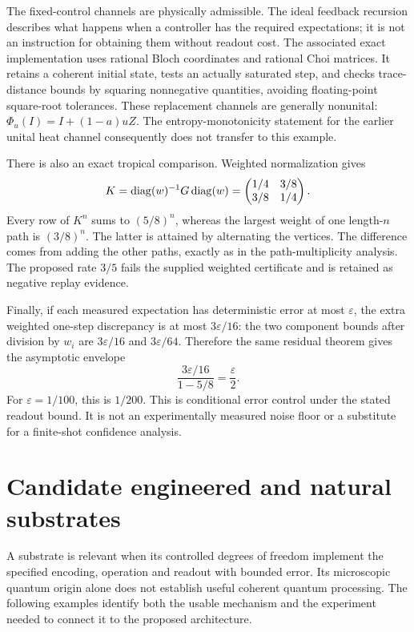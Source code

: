 The fixed-control channels are physically admissible. The ideal feedback
recursion describes what happens when a controller has the required
expectations; it is not an instruction for obtaining them without readout
cost. The associated exact implementation uses rational Bloch coordinates
and rational Choi matrices. It retains a coherent initial state, tests an
actually saturated step, and checks trace-distance bounds by squaring
nonnegative quantities, avoiding floating-point square-root tolerances.
These replacement channels are generally nonunital:
$\Phi_u(I)=I+(1-a)uZ$. The entropy-monotonicity statement for the earlier
unital heat channel consequently does not transfer to this example.

There is also an exact tropical comparison. Weighted normalization gives
\[
 K=\operatorname{diag}(w)^{-1}G\operatorname{diag}(w)
 =\begin{pmatrix}1/4&3/8\\3/8&1/4\end{pmatrix}.
\]
Every row of $K^n$ sums to $(5/8)^n$, whereas the largest weight of one
length-$n$ path is $(3/8)^n$. The latter is attained by alternating the
vertices. The difference comes from adding the other paths, exactly as in
the path-multiplicity analysis. The proposed rate $3/5$ fails the supplied
weighted certificate and is retained as negative replay evidence.

Finally, if each measured expectation has deterministic error at most
$\varepsilon$, the extra weighted one-step discrepancy is at most
$3\varepsilon/16$: the two component bounds after division by $w_i$
are $3\varepsilon/16$ and $3\varepsilon/64$. Therefore the same
residual theorem gives the asymptotic envelope
\[
 \frac{3\varepsilon/16}{1-5/8}=\frac{\varepsilon}{2}.
\]
For $\varepsilon=1/100$, this is $1/200$. This is conditional error
control under the stated readout bound. It is not an experimentally
measured noise floor or a substitute for a finite-shot confidence analysis.

\section{Candidate engineered and natural substrates}

A substrate is relevant when its controlled degrees of freedom implement
the specified encoding, operation and readout with bounded error. Its
microscopic quantum origin alone does not establish useful coherent quantum
processing. The following examples identify both the usable mechanism and
the experiment needed to connect it to the proposed architecture.

